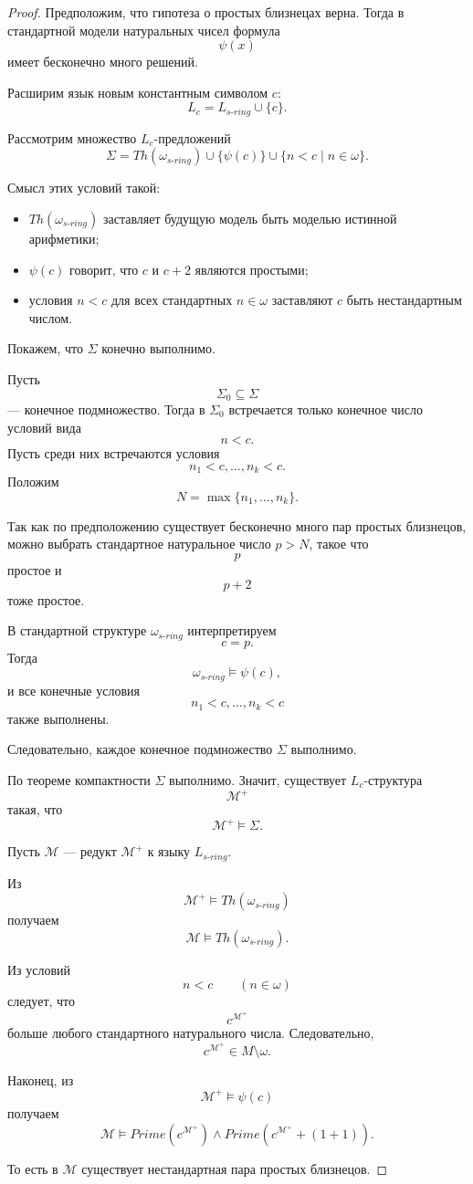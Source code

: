 \documentclass[12pt,a4paper,oneside,openany]{book}
\theoremstyle{definition}
\theoremstyle{plain}
\theoremstyle{remark}
\begin{document}
\begin{proof}
Предположим, что гипотеза о простых близнецах верна. Тогда в стандартной модели натуральных чисел формула
\[
\psi(x)
\]
имеет бесконечно много решений.

Расширим язык новым константным символом \(c\):
\[
L_c=L_{s\text{-}ring}\cup\{c\}.
\]

Рассмотрим множество \(L_c\)-предложений
\[
\Sigma
=
Th(\omega_{s\text{-}ring})
\cup
\{\psi(c)\}
\cup
\{n<c\mid n\in\omega\}.
\]

Смысл этих условий такой:
\begin{itemize}
    \item \(Th(\omega_{s\text{-}ring})\) заставляет будущую модель быть моделью истинной арифметики;
    \item \(\psi(c)\) говорит, что \(c\) и \(c+2\) являются простыми;
    \item условия \(n<c\) для всех стандартных \(n\in\omega\) заставляют \(c\) быть нестандартным числом.
\end{itemize}

Покажем, что \(\Sigma\) конечно выполнимо.

Пусть
\[
\Sigma_0\subseteq\Sigma
\]
— конечное подмножество. Тогда в \(\Sigma_0\) встречается только конечное число условий вида
\[
n<c.
\]
Пусть среди них встречаются условия
\[
n_1<c,\ldots,n_k<c.
\]
Положим
\[
N=\max\{n_1,\ldots,n_k\}.
\]

Так как по предположению существует бесконечно много пар простых близнецов, можно выбрать стандартное натуральное число \(p>N\), такое что
\[
p
\]
простое и
\[
p+2
\]
тоже простое.

В стандартной структуре \(\omega_{s\text{-}ring}\) интерпретируем
\[
c=p.
\]
Тогда
\[
\omega_{s\text{-}ring}\models \psi(c),
\]
и все конечные условия
\[
n_1<c,\ldots,n_k<c
\]
также выполнены.

Следовательно, каждое конечное подмножество \(\Sigma\) выполнимо.

По теореме компактности \(\Sigma\) выполнимо. Значит, существует \(L_c\)-структура
\[
\mathcal M^+
\]
такая, что
\[
\mathcal M^+\models\Sigma.
\]

Пусть \(\mathcal M\) — редукт \(\mathcal M^+\) к языку \(L_{s\text{-}ring}\).

Из
\[
\mathcal M^+\models Th(\omega_{s\text{-}ring})
\]
получаем
\[
\mathcal M\models Th(\omega_{s\text{-}ring}).
\]

Из условий
\[
n<c
\qquad
(n\in\omega)
\]
следует, что
\[
c^{\mathcal M^+}
\]
больше любого стандартного натурального числа. Следовательно,
\[
c^{\mathcal M^+}\in M\setminus\omega.
\]

Наконец, из
\[
\mathcal M^+\models \psi(c)
\]
получаем
\[
\mathcal M\models
Prime(c^{\mathcal M^+})
\wedge
Prime(c^{\mathcal M^+}+(1+1)).
\]

То есть в \(\mathcal M\) существует нестандартная пара простых близнецов.
\end{proof}
\end{document}
